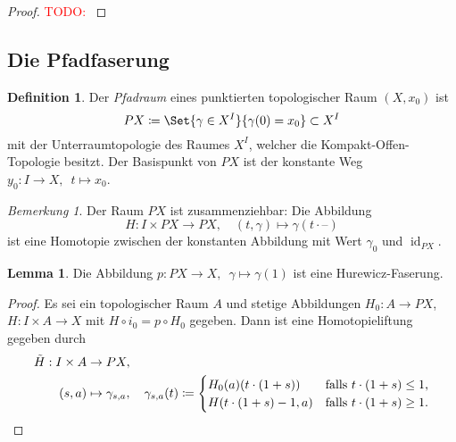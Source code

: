\documentclass[11pt, a4paper, german]{article}
\theoremstyle{definition}
\newtheorem*{lem}{Lemma}
\newtheorem*{defn}{Definition}
\theoremstyle{remark}
\newtheorem*{bem}{Bemerkung}
\newcommand{\TODO}[1]{\textcolor{red}{TODO: #1}} %
\DeclareMathOperator{\id}{id} %
\newcommand{\blank}{\text{--}} %
\newcommand{\I}{I} %
\begin{document}
\begin{proof}
  \TODO{}
\end{proof}


\subsection{Die Pfadfaserung}

\begin{defn}
  Der \emph{Pfadraum} eines punktierten topologischer Raum $(X, x_0)$ ist
  \[ PX \coloneqq \Set{\gamma \in X^\I}{\gamma(0) = x_0} \subset X^I \]
  mit der Unterraumtopologie des Raumes $X^I$, welcher die Kompakt-Offen-Topologie besitzt.
  Der Basispunkt von $PX$ ist der konstante Weg $y_0 : \I \to X, \enspace t \mapsto x_0$.
\end{defn}

\begin{bem}
  Der Raum $PX$ ist zusammenziehbar: Die Abbildung
  \[
    H : \I \times PX \to PX, \quad
    (t, \gamma) \mapsto \gamma(t \cdot \blank)
  \]
  ist eine Homotopie zwischen der konstanten Abbildung mit Wert $\gamma_0$ und $\id_{PX}$.
\end{bem}

\begin{lem}
  Die Abbildung
  $
    p : PX \to X, \enspace
    \gamma \mapsto \gamma(1)
  $
  ist eine Hurewicz-Faserung.
\end{lem}

\begin{proof}
  Es sei ein topologischer Raum $A$ und stetige Abbildungen $H_0 : A \to PX$, $H : \I \times A \to X$ mit $H \circ i_0 = p \circ H_0$ gegeben.
  Dann ist eine Homotopieliftung gegeben durch
  \begin{align*}
    \tilde{H} : \I \times A & \to PX, \\
    (s, a) & \mapsto \gamma_{s, a}, \quad
    \gamma_{s, a}(t) \coloneqq \begin{cases}
      H_0(a)(t \cdot (1+s)) & \text{falls $t \cdot (1+s) \leq 1$,} \\
      H(t \cdot (1+s) - 1, a) & \text{falls $t \cdot (1+s) \geq 1$.}
      \qedhere
    \end{cases}
  \end{align*}
\end{proof}
\end{document}
